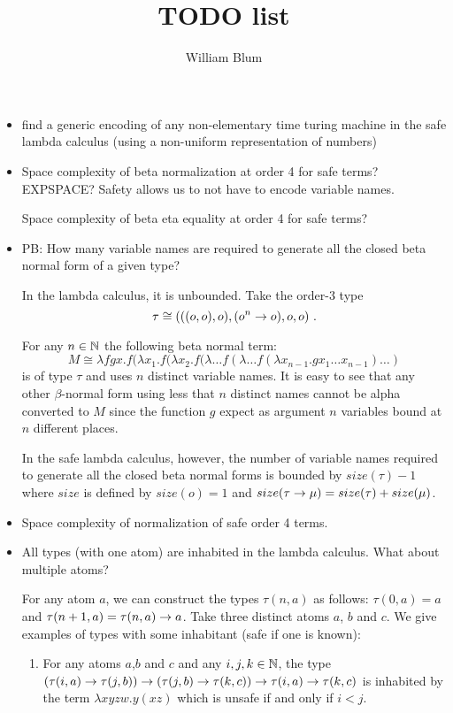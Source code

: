 \documentclass{article}
\title{TODO list}
\author{William Blum}
\begin{document}
\maketitle
\begin{itemize}


\item find a generic encoding of any non-elementary time turing machine
in the safe lambda calculus (using a non-uniform representation of
numbers)

\item Space complexity of beta normalization at order 4 for safe terms?
EXPSPACE? Safety allows us to not have to encode variable names.

\itme Space complexity of beta eta equality at order 4 for safe terms?

\item PB: How many variable names are required to generate all the
closed beta normal form of a given type?

In the lambda calculus, it is unbounded. Take the order-3 type
$$\tau
\cong (((o,o),o), (o^n\rightarrow o), o, o) \ . $$

For any $n\in\mathbb{N}$ the following beta normal term:
$$ M \cong \lambda f g x . f (\lambda x_1.f(\lambda x_2.f(\lambda \ldots f(\lambda \ldots f(\lambda x_{n-1}.g x_1 \ldots x_{n-1}) \ldots )$$
is of type $\tau$ and uses $n$ distinct variable names. It is easy to see that
any other $\beta$-normal form using less that $n$ distinct names cannot be alpha converted to $M$
since the function $g$ expect as argument $n$ variables bound at $n$ different places.


In the safe lambda calculus, however, the number of variable names
required to generate all the closed beta normal forms is bounded by
$size(\tau)-1$ where $size$ is defined by $size(o)= 1$ and
$size(\tau\rightarrow\mu) = size(\tau) + size(\mu)$.

\item Space complexity of normalization of safe order 4 terms.

\item All types (with one atom) are inhabited in the lambda
calculus. What about multiple atoms?

For any atom $a$, we can construct the types $\tau(n,a)$
as follows: $\tau(0,a) = a$ and $\tau(n+1,a) = \tau(n,a) \rightarrow a$.
Take three distinct atoms $a$, $b$ and $c$. We give examples of types with some inhabitant (safe if one is known):
\begin{enumerate}
\item For any atoms $a$,$b$ and $c$ and any $i,j,k\in\mathbb{N}$, the type
$(\tau(i,a) \rightarrow \tau(j,b)) \rightarrow (\tau(j,b) \rightarrow \tau(k,c)) \rightarrow \tau(i,a) \rightarrow
\tau(k,c)$ is inhabited by the term $\lambda x y z w . y (x z)$ which is unsafe if and only if $i<j$.



\end{enumerate}
\end{itemize}
\end{document}
